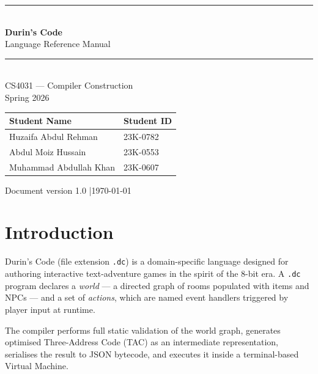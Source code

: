 \documentclass[12pt, a4paper]{article}
\begin{document}
\begin{titlepage}
  \centering
  \vspace*{2cm}
  {\color{durins-blue}\rule{\linewidth}{2pt}}\\[1em]
  {\Huge\bfseries\color{durins-blue} Durin's Code}\\[0.5em]
  {\LARGE\color{durins-gold} Language Reference Manual}\\[1em]
  {\color{durins-blue}\rule{\linewidth}{2pt}}\\[2em]

  {\large CS4031 --- Compiler Construction \\ Spring 2026}\\[3em]

  \begin{tabular}{ll}
    \toprule
    \textbf{Student Name} & \textbf{Student ID} \\
    \midrule
    Huzaifa Abdul Rehman  & 23K-0782 \\
    Abdul Moiz Hussain    & 23K-0553 \\
    Muhammad Abdullah Khan & 23K-0607 \\
    \bottomrule
  \end{tabular}

  \vfill
  {\small\color{durins-gray} Document version 1.0 \quad|\quad \today}
\end{titlepage}

\tableofcontents
\newpage

\section{Introduction}

Durin's Code (file extension \texttt{.dc}) is a domain-specific language designed for
authoring interactive text-adventure games in the spirit of the 8-bit era.
A \texttt{.dc} program declares a \emph{world} --- a directed graph of rooms populated with
items and NPCs --- and a set of \emph{actions}, which are named event handlers triggered by
player input at runtime.

The compiler performs full static validation of the world graph, generates optimised
Three-Address Code (TAC) as an intermediate representation, serialises the result to
JSON bytecode, and executes it inside a terminal-based Virtual Machine.
\end{document}
